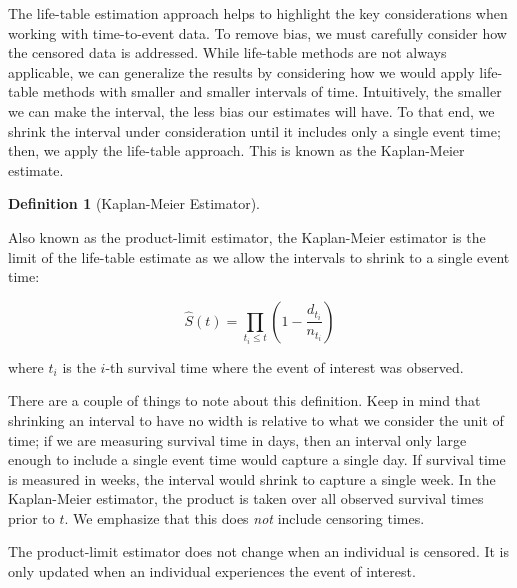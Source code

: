 \documentclass[
  letterpaper,
  DIV=11,
  numbers=noendperiod]{scrreprt}
\theoremstyle{definition}
\newtheorem{definition}{Definition}[chapter]
\theoremstyle{definition}
\theoremstyle{remark}
\begin{document}
The life-table estimation approach helps to highlight the key
considerations when working with time-to-event data. To remove bias, we
must carefully consider how the censored data is addressed. While
life-table methods are not always applicable, we can generalize the
results by considering how we would apply life-table methods with
smaller and smaller intervals of time. Intuitively, the smaller we can
make the interval, the less bias our estimates will have. To that end,
we shrink the interval under consideration until it includes only a
single event time; then, we apply the life-table approach. This is known
as the Kaplan-Meier estimate.

\begin{definition}[Kaplan-Meier
Estimator]\protect\hypertarget{def-kaplan-meier}{}\label{def-kaplan-meier}

Also known as the product-limit estimator, the Kaplan-Meier estimator is
the limit of the life-table estimate as we allow the intervals to shrink
to a single event time:

\[\widehat{S}(t) = \prod_{t_i \leq t} \left(1 - \frac{d_{t_i}}{n_{t_i}}\right)\]

where \(t_i\) is the \(i\)-th survival time where the event of interest
was observed.

\end{definition}

There are a couple of things to note about this definition. Keep in mind
that shrinking an interval to have no width is relative to what we
consider the unit of time; if we are measuring survival time in days,
then an interval only large enough to include a single event time would
capture a single day. If survival time is measured in weeks, the
interval would shrink to capture a single week. In the Kaplan-Meier
estimator, the product is taken over all observed survival times prior
to \(t\). We emphasize that this does \emph{not} include censoring
times.

\begin{tcolorbox}[enhanced jigsaw, left=2mm, toprule=.15mm, arc=.35mm, breakable, opacitybacktitle=0.6, opacityback=0, rightrule=.15mm, colbacktitle=quarto-callout-warning-color!10!white, coltitle=black, leftrule=.75mm, toptitle=1mm, colframe=quarto-callout-warning-color-frame, titlerule=0mm, title=\textcolor{quarto-callout-warning-color}{\faExclamationTriangle}\hspace{0.5em}{Warning}, bottomrule=.15mm, colback=white, bottomtitle=1mm]

The product-limit estimator does not change when an individual is
censored. It is only updated when an individual experiences the event of
interest.

\end{tcolorbox}
\end{document}
